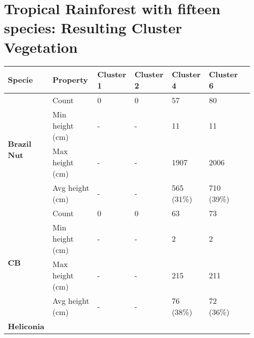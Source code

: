 \chapter{Tropical Rainforest with fifteen species: Resulting Cluster Vegetation } \label{AppendixH}


\begin{longtable}{|p{2cm}|p{2cm}|p{2cm}|p{2cm}|p{2cm}|p{2cm}|p{2cm}|}
		\hline	
		\textbf{Specie} & \textbf{Property} & \textbf{Cluster 1} & \textbf{Cluster 2} & \textbf{Cluster 4} & \textbf{Cluster 6} \\
		\hline
		\multirow{4}{*}{\textbf{Brazil Nut}} & 
						\multicolumn{1}{l|}{Count} & 
						\multicolumn{1}{l|}{0} & 
						\multicolumn{1}{l|}{0} &
						\multicolumn{1}{l|}{57} & 
						\multicolumn{1}{l|}{80}\\\cline{2-7} &
						\multicolumn{1}{l|}{Min height (cm)} & 
						\multicolumn{1}{l|}{-} & 
						\multicolumn{1}{l|}{-} &
						\multicolumn{1}{l|}{11} & 
						\multicolumn{1}{l|}{11}\\\cline{2-7} &
						\multicolumn{1}{l|}{Max height (cm)} & 
						\multicolumn{1}{l|}{-} & 
						\multicolumn{1}{l|}{-} &
						\multicolumn{1}{l|}{1907} & 
						\multicolumn{1}{l|}{2006}\\\cline{2-7} &
						\multicolumn{1}{l|}{Avg height (cm)} & 
						\multicolumn{1}{l|}{-} & 
						\multicolumn{1}{l|}{-} &
						\multicolumn{1}{l|}{565 (31\%) } & 
						\multicolumn{1}{l|}{710 (39\%)} \\\cline{2-7}
		\hline       
		\multirow{4}{*}{\textbf{CB}} & 
						\multicolumn{1}{l|}{Count} & 
						\multicolumn{1}{l|}{0} & 
						\multicolumn{1}{l|}{0} &
						\multicolumn{1}{l|}{63} & 
						\multicolumn{1}{l|}{73}\\\cline{2-7} &
						\multicolumn{1}{l|}{Min height (cm)} & 
						\multicolumn{1}{l|}{-} & 
						\multicolumn{1}{l|}{-} &
						\multicolumn{1}{l|}{2} & 
						\multicolumn{1}{l|}{2} \\\cline{2-7} &
						\multicolumn{1}{l|}{Max height (cm)} & 
						\multicolumn{1}{l|}{-} & 
						\multicolumn{1}{l|}{-} &
						\multicolumn{1}{l|}{215} & 
						\multicolumn{1}{l|}{211}\\\cline{2-7} &
						\multicolumn{1}{l|}{Avg height (cm)} & 
						\multicolumn{1}{l|}{-} & 
						\multicolumn{1}{l|}{-} &
						\multicolumn{1}{l|}{76 (38\%)} & 
						\multicolumn{1}{l|}{72 (36\%)} \\\cline{2-7}
		\hline      
		\multirow{4}{*}{\textbf{Heliconia}} & 

\end{longtable}

